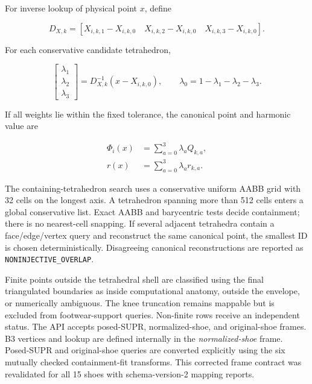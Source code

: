 \documentclass[11pt]{article}
\begin{document}
For inverse lookup of physical point $x$, define

\begin{equation}
  D_{X,k}=[X_{i,k,1}-X_{i,k,0}\quad
           X_{i,k,2}-X_{i,k,0}\quad
           X_{i,k,3}-X_{i,k,0}].
\end{equation}

For each conservative candidate tetrahedron,

\begin{equation}
  \begin{bmatrix}\lambda_1\\\lambda_2\\\lambda_3\end{bmatrix}
  =D_{X,k}^{-1}(x-X_{i,k,0}),
  \qquad
  \lambda_0=1-\lambda_1-\lambda_2-\lambda_3.
  \label{eq:inverse-barycentric}
\end{equation}

If all weights lie within the fixed tolerance, the canonical point and harmonic value are

\begin{align}
  \Phi_i(x)&=\sum_{a=0}^{3}\lambda_aQ_{k,a},\\
  r(x)&=\sum_{a=0}^{3}\lambda_a r_{k,a}.
  \label{eq:inverse-map}
\end{align}

The containing-tetrahedron search uses a conservative uniform AABB grid with 32 cells on
the longest axis. A tetrahedron spanning more than 512 cells enters a global conservative
list. Exact AABB and barycentric tests decide containment; there is no nearest-cell
snapping. If several adjacent tetrahedra contain a face/edge/vertex query and reconstruct
the same canonical point, the smallest ID is chosen deterministically. Disagreeing
canonical reconstructions are reported as \texttt{NONINJECTIVE\_OVERLAP}.

Finite points outside the tetrahedral shell are classified using the final triangulated
boundaries as inside computational anatomy, outside the envelope, or numerically
ambiguous. The knee truncation remains mappable but is excluded from footwear-support
queries. Non-finite rows receive an independent status. The API accepts posed-SUPR,
normalized-shoe, and original-shoe frames. B3 vertices and lookup are defined internally
in the \emph{normalized-shoe} frame. Posed-SUPR and original-shoe queries are converted
explicitly using the six mutually checked containment-fit transforms. This corrected
frame contract was revalidated for all 15 shoes with schema-version-2 mapping reports.
\end{document}

